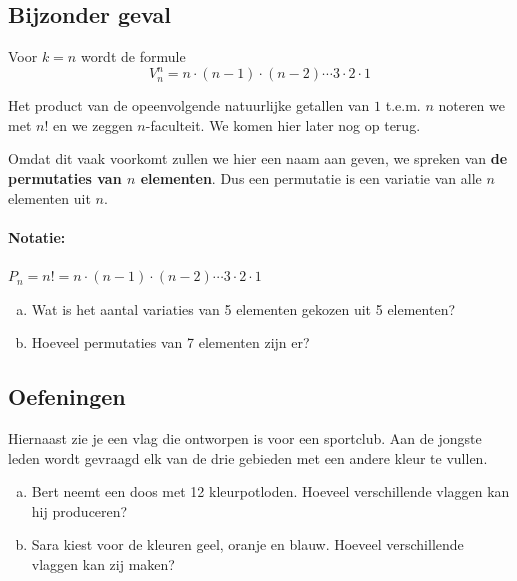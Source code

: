 \documentclass[12pt,a4paper,twoside]{article}
\begin{document}
\subsection{Bijzonder geval}

Voor $k=n$ wordt de formule
\[V^n_n = n \cdot (n-1) \cdot (n-2) \cdots 3 \cdot 2 \cdot 1\]

Het product van de opeenvolgende natuurlijke getallen van $1$ t.e.m. $n$ noteren we met $n!$ en we zeggen $n$-faculteit. We komen hier later nog op terug.

Omdat dit vaak voorkomt zullen we hier een naam aan geven, we spreken van {\bf de permutaties van $n$ elementen}. Dus een permutatie is een variatie van alle $n$ elementen uit $n$.

\paragraph*{Notatie:} $P_n = n! = n \cdot (n-1) \cdot (n-2) \cdots 3 \cdot 2 \cdot 1$

\begin{oefening}
\begin{enumerate}[(a)]
  \item Wat is het aantal variaties van 5 elementen gekozen uit 5 elementen?
  \item Hoeveel permutaties van 7 elementen zijn er?
\end{enumerate}
\end{oefening}

\subsection{Oefeningen}

\begin{minipage}{0.7\textwidth}
\begin{oefening}
Hiernaast zie je een vlag die ontworpen is voor een sportclub. Aan de jongste leden wordt gevraagd elk van de drie gebieden met een andere kleur te vullen.
\begin{enumerate}[(a)]
  \item Bert neemt een doos met 12 kleurpotloden. Hoeveel verschillende vlaggen kan hij produceren?
  \item Sara kiest voor de kleuren geel, oranje en blauw. Hoeveel verschillende vlaggen kan zij maken?
\end{enumerate}
\end{oefening}
\end{minipage}
\begin{minipage}{0.25\textwidth}
\end{minipage}
\end{document}
